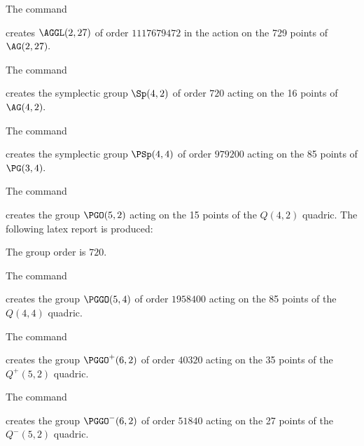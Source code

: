\bigskip




The command


creates $\AGGL(2,27)$ of order $1117679472$ 
in the action on the 729 points of $\AG(2,27).$

\bigskip







The command 


creates the symplectic group $\Sp(4,2)$ of order $720$ 
acting on the 16 points of $\AG(4,2).$


\bigskip







The command 


creates the symplectic group $\PSp(4,4)$ of order $979200$ 
acting on the 85 points of $\PG(3,4).$


\bigskip



The command 


creates the group $\PGO(5,2)$ acting on the 15 points of the $Q(4,2)$ quadric. 
The following latex report is produced:

The group order is $720$.


\bigskip



The command 


creates the group $\PGGO(5,4)$ of order $1958400$ 
acting on the 85 points of the $Q(4,4)$ quadric. 


\bigskip



The command 


creates the group $\PGGO^+(6,2)$ of order $40320$ 
acting on the 35 points of the $Q^+(5,2)$ quadric. 


\bigskip


The command 


creates the group $\PGGO^-(6,2)$ of order $51840$ 
acting on the 27 points of the $Q^-(5,2)$ quadric. 



